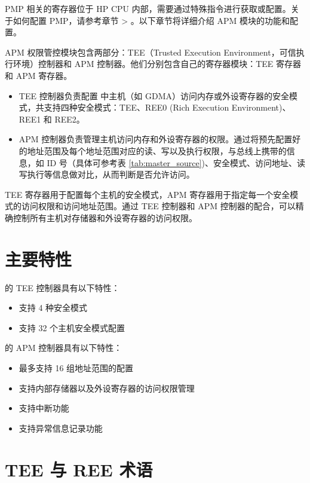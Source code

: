 \documentclass[main\_\_CN.tex]{subfiles}
\begin{document}
PMP 相关的寄存器位于 HP CPU 内部，需要通过特殊指令进行获取或配置。关于如何配置 PMP，请参考章节 \textit{} > \textit{}。以下章节将详细介绍 APM 模块的功能和配置。


APM 权限管控模块包含两部分：TEE（Trusted Execution Environment，可信执行环境）控制器和 APM 控制器。他们分别包含自己的寄存器模块：TEE 寄存器和 APM 寄存器。


\begin{itemize}
    \item TEE 控制器负责配置 \chipname{} 中主机（如 GDMA）访问内存或外设寄存器的安全模式，共支持四种安全模式：TEE、REE0 (Rich Execution Environment)、REE1 和 REE2。
    \item APM 控制器负责管理主机访问内存和外设寄存器的权限。通过将预先配置好的地址范围及每个地址范围对应的读、写以及执行权限，与总线上携带的信息，如 ID 号（具体可参考表 \ref{tab:master_source})、安全模式、访问地址、读写执行等信息做对比，从而判断是否允许访问。
\end{itemize}

TEE 寄存器用于配置每个主机的安全模式，APM 寄存器用于指定每一个安全模式的访问权限和访问地址范围。通过 TEE 控制器和 APM 控制器的配合，可以精确控制所有主机对存储器和外设寄存器的访问权限。


\section{主要特性}\label{sec:permctrl-features}

\chipname{} 的 TEE 控制器具有以下特性：

\begin{itemize}
    \item 支持 4 种安全模式
    \item 支持 32 个主机安全模式配置

\end{itemize}

\chipname{} 的 APM 控制器具有以下特性：

\begin{itemize}
    \item 最多支持 16 组地址范围的配置
    \item 支持内部存储器以及外设寄存器的访问权限管理
    \item 支持中断功能
    \item 支持异常信息记录功能
\end{itemize}

\section{TEE 与 REE 术语}
\end{document}
